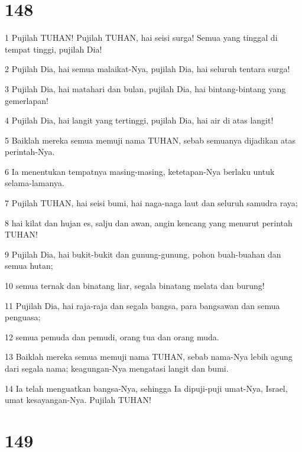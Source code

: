 \chapter{148}

\par 1 Pujilah TUHAN! Pujilah TUHAN, hai seisi surga! Semua yang tinggal di tempat tinggi, pujilah Dia!
\par 2 Pujilah Dia, hai semua malaikat-Nya, pujilah Dia, hai seluruh tentara surga!
\par 3 Pujilah Dia, hai matahari dan bulan, pujilah Dia, hai bintang-bintang yang gemerlapan!
\par 4 Pujilah Dia, hai langit yang tertinggi, pujilah Dia, hai air di atas langit!
\par 5 Baiklah mereka semua memuji nama TUHAN, sebab semuanya dijadikan atas perintah-Nya.
\par 6 Ia menentukan tempatnya masing-masing, ketetapan-Nya berlaku untuk selama-lamanya.
\par 7 Pujilah TUHAN, hai seisi bumi, hai naga-naga laut dan seluruh samudra raya;
\par 8 hai kilat dan hujan es, salju dan awan, angin kencang yang menurut perintah TUHAN!
\par 9 Pujilah Dia, hai bukit-bukit dan gunung-gunung, pohon buah-buahan dan semua hutan;
\par 10 semua ternak dan binatang liar, segala binatang melata dan burung!
\par 11 Pujilah Dia, hai raja-raja dan segala bangsa, para bangsawan dan semua penguasa;
\par 12 semua pemuda dan pemudi, orang tua dan orang muda.
\par 13 Baiklah mereka semua memuji nama TUHAN, sebab nama-Nya lebih agung dari segala nama; keagungan-Nya mengatasi langit dan bumi.
\par 14 Ia telah menguatkan bangsa-Nya, sehingga Ia dipuji-puji umat-Nya, Israel, umat kesayangan-Nya. Pujilah TUHAN!

\chapter{149}

